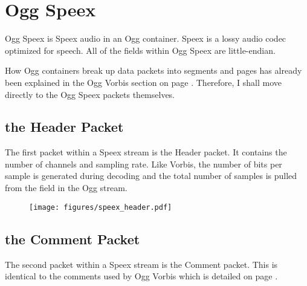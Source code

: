 
\chapter{Ogg Speex}
Ogg Speex is Speex audio in an Ogg container.
Speex is a lossy audio codec optimized for speech.
All of the fields within Ogg Speex are little-endian.

How Ogg containers break up data packets into segments and pages
has already been explained in the Ogg Vorbis section on page \pageref{vorbis}.
Therefore, I shall move directly to the Ogg Speex packets themselves.

\section{the Header Packet}

The first packet within a Speex stream is the Header packet.
It contains the number of channels and sampling rate.
Like Vorbis, the number of bits per sample is generated during
decoding and the total number of samples is pulled from the
 field in the Ogg stream.

\begin{figure}[h]
\texttt{[image: figures/speex\_header.pdf]}
\end{figure}

\section{the Comment Packet}

The second packet within a Speex stream is the Comment packet.
This is identical to the comments used by Ogg Vorbis which is
detailed on page \pageref{vorbiscomment}.
